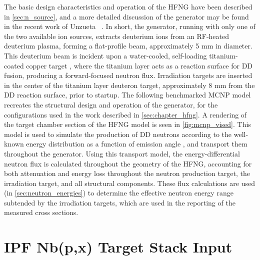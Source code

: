 The basic design characteristics and operation of the HFNG have been described in \autoref{sec:n_source}, and a more detailed discussion of the generator may be found in the recent work of Unzueta \etal\ \cite{ayllon2018design}.
In short, the generator, running with only one of the two available ion sources, extracts deuterium ions from an RF-heated deuterium plasma, forming a flat-profile beam, approximately 5 mm in diameter.
This deuterium beam is incident upon a water-cooled, self-loading titanium-coated copper target \cite{Waltz2017,Waltz2016a,ayllon2018design}, where the titanium layer acts as a reaction surface for DD fusion, producing a forward-focused neutron flux.
Irradiation targets are inserted in the center of the titanium layer deuteron target, approximately 8 mm from the DD reaction surface, prior to startup.
The following benchmarked MCNP model recreates the structural design and operation of the generator, for the configurations used in the work described in \autoref{sec:chapter_hfng}.
A rendering of the target chamber section of the HFNG model is seen in \autoref{fig:mcnp_vised}.
This model is used to simulate the production of DD neutrons according to the well-known energy distribution as a function of  emission angle \cite{Liskien_Paulsen_1973}, and transport them throughout the generator.
Using this transport model, the energy-differential neutron flux is calculated throughout the geometry of the HFNG, accounting for both attenuation and energy loss throughout the neutron production target, the irradiation target, and all structural components.
These flux calculations are used (in \autoref{sec:neutron_energies}) to determine the effective neutron energy range subtended by the irradiation targets, which are used in the reporting of the measured cross sections.







\section{IPF Nb(p,x) Target Stack Input} \label{sec:ipf_mcnp_deck}


